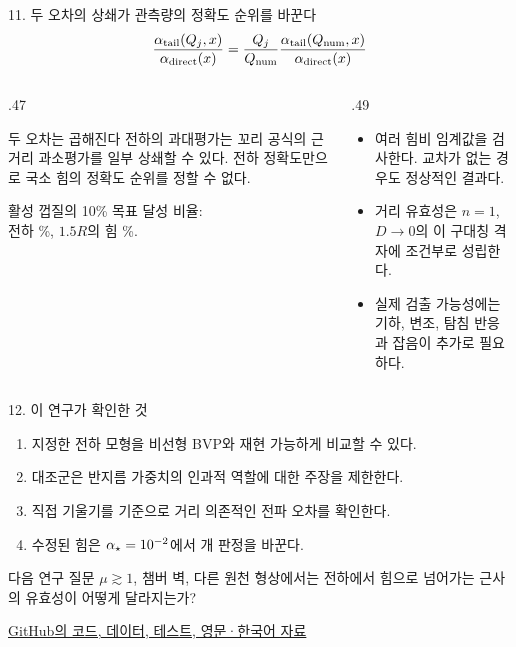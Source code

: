 \documentclass[10pt,aspectratio=169]{beamer}
\begin{document}
\begin{frame}{11. 두 오차의 상쇄가 관측량의 정확도 순위를 바꾼다}
 \[\frac{\alpha_{\mathrm{tail}}(Q_j,x)}{\alpha_{\mathrm{direct}}(x)}=
   \frac{Q_j}{Q_{\mathrm{num}}}\frac{\alpha_{\mathrm{tail}}(Q_{\mathrm{num}},x)}{\alpha_{\mathrm{direct}}(x)}\]
 \begin{columns}[T,onlytextwidth]
 \begin{column}{.47\textwidth}
  \begin{block}{두 오차는 곱해진다}
   전하의 과대평가는 꼬리 공식의 근거리 과소평가를 일부 상쇄할 수 있다.
   전하 정확도만으로 국소 힘의 정확도 순위를 정할 수 없다.
  \end{block}
  \small 활성 껍질의 10\% 목표 달성 비율:\\
  전하 \StudyASWithin\%, $1.5R$의 힘 \StudyASLocalWithin\%.
 \end{column}
 \begin{column}{.49\textwidth}
  \small
  \begin{itemize}
   \item 여러 힘비 임계값을 검사한다. 교차가 없는 경우도 정상적인 결과다.
   \item 거리 유효성은 $n=1$, $D\to0$의 이 구대칭 격자에 조건부로 성립한다.
   \item 실제 검출 가능성에는 기하, 변조, 탐침 반응과 잡음이 추가로 필요하다.
  \end{itemize}
 \end{column}
 \end{columns}
\end{frame}

\begin{frame}{12. 이 연구가 확인한 것}
 \begin{enumerate}
  \item 지정한 전하 모형을 비선형 BVP와 재현 가능하게 비교할 수 있다.
  \item 대조군은 반지름 가중치의 인과적 역할에 대한 주장을 제한한다.
  \item 직접 기울기를 기준으로 거리 의존적인 전파 오차를 확인한다.
  \item 수정된 힘은 $\alpha_\star=10^{-2}$에서 \StudyTailFlips 개 판정을 바꾼다.
 \end{enumerate}
 \vspace{.2cm}
 \begin{block}{다음 연구 질문}
  $\mu\gtrsim1$, 챔버 벽, 다른 원천 형상에서는 전하에서 힘으로 넘어가는 근사의
  유효성이 어떻게 달라지는가?
 \end{block}
 \centering\small
 \href{https://github.com/Lasqui-Ponto/Mechanics_Term_Project/tree/agent/improve-chameleon-project/Thin_Shell_Study}{GitHub의 코드, 데이터, 테스트, 영문·한국어 자료}
\end{frame}
\end{document}
